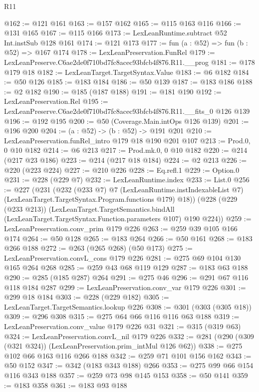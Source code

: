 \begin{lexlean}{R11}
\begin{coremodule}
@162 := @121 @161
@163 := @157 @162
@165 := @115 @163 @116
@166 := @131 @165
@167 := @115 @166
@173 := LexLeanRuntime.subtract @52 Int.instSub @128 @161
@174 := @121 @173
@177 := fun (a : @52) => fun (b : @52) => @167 @174
@178 := LexLeanPreservation.FunRel
@179 := LexLeanPreserve.C6ae2de0f710bd7fc8acec93bfcb4f876.R11.__prog
@181 := @178 @179 @18
@182 := LexLeanTarget.TargetSyntax.Value
@183 := @6 @182
@184 := @50 @126
@185 := @183 @184
@186 := @50 @139
@187 := @183 @186
@188 := @2 @182
@190 := @185 (@187 @188)
@191 := @181 @190
@192 := LexLeanPreservation.Rel
@195 := LexLeanPreserve.C6ae2de0f710bd7fc8acec93bfcb4f876.R11.__fits_0 @126 @139
@196 := @192 @195
@200 := @50 (Coverage.Main.intOps @126 @139)
@201 := @196 @200
@204 := (a : @52) -> (b : @52) -> @191 @201
@210 := LexLeanPreservation.funRel_intro @179 @18 @190 @201 @107
@213 := Prod.{0, 0} @10 @182
@214 := @6 @213
@217 := Prod.mk.{0, 0} @10 @182
@220 := @214 (@217 @23 @186)
@223 := @214 (@217 @18 @184)
@224 := @2 @213
@226 := @220 (@223 @224)
@227 := @210 @226
@228 := Eq.refl.{1}
@229 := Option.{0}
@231 := @228 (@229 @7)
@232 := LexLeanRuntime.index
@233 := List.{0}
@256 := @227
    (@231
      (@232
        (@233 @7)
        @7
        (LexLeanRuntime.instIndexableList @7)
        (LexLeanTarget.TargetSyntax.Program.functions @179)
        @18))
    (@228
      (@229 (@233 @213))
      (LexLeanTarget.TargetSemantics.bindAll
        (LexLeanTarget.TargetSyntax.Function.parameters @107)
        @190
        @224))
@259 := LexLeanPreservation.conv_prim @179 @226
@263 := @259 @39 @105 @166 @174
@264 := @50 @128
@265 := @183 @264
@266 := @50 @161
@268 := @183 @266 @188
@272 := @263 (@265 @268) (@50 @173)
@275 := LexLeanPreservation.convL_cons @179 @226
@281 := @275 @69 @104 @130 @165 @264 @268
@285 := @259 @43 @68 @119 @129
@287 := @183 @63 @188
@290 := @285 (@185 @287) @264
@291 := @275 @46
@296 := @291 @67 @116 @118 @184 @287
@299 := LexLeanPreservation.conv_var @179 @226
@301 := @299 @18 @184
@303 := @228 (@229 @182)
@305 := LexLeanTarget.TargetSemantics.lookup @226
@308 := @301 (@303 (@305 @18))
@309 := @296 @308
@315 := @275 @64 @66 @116 @116 @63 @188
@319 := LexLeanPreservation.conv_value @179 @226 @31
@321 := @315 (@319 @63)
@324 := LexLeanPreservation.convL_nil @179 @226
@332 := @281 (@290 (@309 (@321 @324)) (LexLeanPreservation.prim_intMul @126 @62))
@338 := @275 @102 @66 @163 @116 @266 @188
@342 := @259 @71 @101 @156 @162
@343 := @50 @152
@347 := @342 (@183 @343 @188) @266
@353 := @275 @99 @66 @154 @116 @343 @188
@357 := @259 @73 @98 @145 @153
@358 := @50 @141
@359 := @183 @358
@361 := @183 @93 @188

\end{coremodule}
\end{lexlean}
